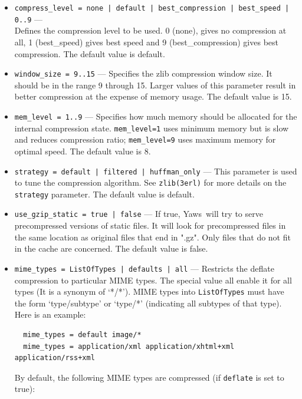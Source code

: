 \documentclass[11pt,oneside,english]{book}
\newcommand{\Yaws}            %
        {{\sc Yaws}}
\begin{document}
\begin{itemize}
\begin{itemize}
             \item \verb+compress_level = none | default | best_compression | best_speed | 0..9+ ---\\
               Defines the compression level to be used. 0 (none), gives no
               compression at all, 1 (best\_speed) gives best speed and 9
               (best\_compression) gives best compression. The default value is
               default.

             \item \verb+window_size = 9..15+ --- Specifies the zlib compression
               window size. It should be in the range 9 through 15. Larger
               values of this parameter result in better compression at the
               expense of memory usage. The default value is 15.

             \item \verb+mem_level = 1..9+ --- Specifies how much memory should
               be allocated for the internal compression
               state. \verb+mem_level=1+ uses minimum memory but is slow and
               reduces compression ratio; \verb+mem_level=9+ uses maximum memory
               for optimal speed. The default value is 8.

             \item \verb+strategy = default | filtered | huffman_only+ --- This
               parameter is used to tune the compression algorithm. See
               \verb+zlib(3erl)+ for more details on the \verb+strategy+
               parameter. The default value is default.

             \item \verb+use_gzip_static = true | false+ --- If true,
               \Yaws\ will try to serve precompressed versions of static
               files. It will look for precompressed files in the same location
               as original files that end in ".gz". Only files that do not fit
               in the cache are concerned. The default value is false.

             \item \verb+mime_types = ListOfTypes | defaults | all+ ---
               Restricts the deflate compression to particular MIME types. The
               special value all enable it for all types (It is a synonym of
               `*/*'). MIME types into \verb+ListOfTypes+ must have the form
               `type/subtype' or `type/*' (indicating all subtypes of that
               type). Here is an example:
\begin{verbatim}
  mime_types = default image/*
  mime_types = application/xml application/xhtml+xml application/rss+xml
\end{verbatim}
                    By default, the following MIME types are compressed (if
                    \verb+deflate+ is set to true):


\end{itemize}
\end{itemize}
\end{document}

